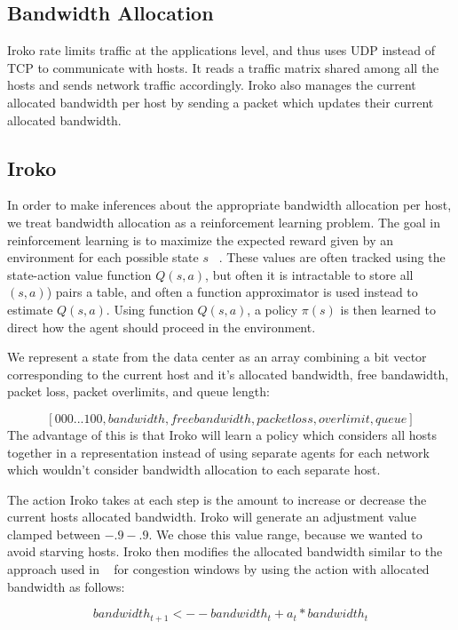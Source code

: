 \subsection{Bandwidth Allocation}
Iroko rate limits traffic at the applications level, and thus uses UDP instead of TCP to communicate with hosts. It reads a traffic matrix shared among all the hosts and sends network traffic accordingly. Iroko also manages the current allocated bandwidth per host by sending a packet which updates their current allocated bandwidth.


\subsection{Iroko}

In order to make inferences about the appropriate bandwidth allocation per host, we treat bandwidth allocation as a reinforcement learning problem. The goal in reinforcement learning is to maximize the expected reward given by an environment for each possible state $s$ ~\cite{Sutton:1998:IRL:551283}. These values are often tracked using the state-action value function $Q(s,a)$, but often it is intractable to store all $(s,a)$) pairs a table, and often a function approximator is used instead to estimate $Q(s,a)$. Using function $Q(s,a)$, a policy $\pi(s)$ is then learned to direct how the agent should proceed in the environment.
 

We represent a state from the data center as an array combining a bit vector corresponding to the current host and it's allocated bandwidth, free bandawidth, packet loss, packet overlimits, and queue length:

\[ [0 0 0 ... 1 0 0, bandwidth, free bandwidth, packet loss, overlimit, queue ] \]
The advantage of this is that Iroko will learn a policy which considers all hosts together in a representation instead of using separate agents for each network which wouldn't consider bandwidth allocation to each separate host.

The action Iroko takes at each step is the amount to increase or decrease the current hosts allocated bandwidth. Iroko will generate an adjustment value clamped between $-.9 - .9$. We chose this value range, because we wanted to avoid starving hosts.  Iroko then modifies the allocated bandwidth similar to the approach used in ~\cite{remy} for congestion windows by using the action with allocated bandwidth as follows:

\[bandwidth_{t+1}   <-- bandwidth_t +  a_t * bandwidth_t\]

